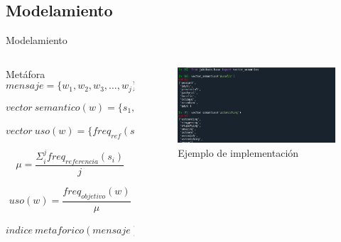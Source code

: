 \documentclass[presentation]{beamer}
\begin{document}
\subsection{Modelamiento}
\label{sec:org782ae67}
\begin{frame}[label={sec:org3662c6f}]{Modelamiento}
\begin{columns}
\begin{column}{0.48\columnwidth}
\tiny
    \begin{block}{Metáfora}
\begin{equation}
\label{eq:mensaje}
mensaje = \{ w_1, w_2, w_3, \dots , w_j \}
\end{equation}

\begin{equation}
\label{eq:vector_semantico}
vector\ semantico(w) = \{s_1, s_2, s_3, \dots, s_j \} 
\end{equation}

\begin{equation}
\label{eq:vector_uso}
vector\ uso(w) = \{freq_{ref}(s_1),freq_{ref}(s_2),freq_{ref}(s_3), \dots, freq_{ref}(s_j) \} 
\end{equation}

\begin{equation}
\label{eq:promedio}
\mu = \frac{\Sigma_i^jfreq_{referencia}(s_i)}{j}
\end{equation}


\begin{equation}
\label{eq:uso}
uso(w) = \frac{freq_{objetivo}(w)}{\mu}
\end{equation}


\begin{equation}
\label{eq:indice_metafórico}
indice\ metaforico(mensaje) =  \Sigma_i^j uso(w_i)
\end{equation}
\end{block}
\normalsize
\end{column}
\begin{column}{0.48\columnwidth}
     \begin{figure}
\includegraphics[width=\textwidth]{./assets/codigo_vector_semantico.png}
\caption{Ejemplo de implementación}
\end{figure}


\end{column}
\end{columns}
\end{frame}
\end{document}

